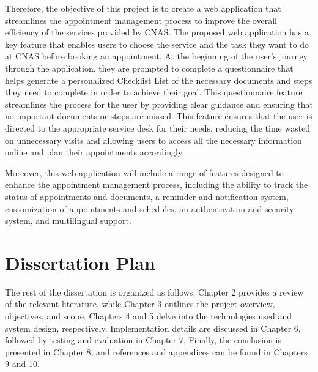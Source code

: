 Therefore, the objective of this project is to create a web application that streamlines the appointment management process to improve the overall efficiency of the services provided by CNAS. The proposed web application has a key feature that enables users to choose the service and the task they want to do at CNAS before booking an appointment. At the beginning of the user's journey through the application, they are prompted to complete a questionnaire that helps generate a personalized Checklist List of the necessary documents and steps they need to complete in order to achieve their goal. This questionnaire feature streamlines the process for the user by providing clear guidance and ensuring that no important documents or steps are missed. This feature ensures that the user is directed to the appropriate service desk for their needs, reducing the time wasted on unnecessary visits and allowing users to access all the necessary information online and plan their appointments accordingly.

Moreover, this web application will include a range of features designed to enhance the appointment management process, including the ability to track the status of appointments and documents, a reminder and notification system, customization of appointments and schedules, an authentication and security system, and multilingual support.


\section{Dissertation Plan}

The rest of the dissertation is organized as follows: Chapter 2 provides a review of the relevant literature, while Chapter 3 outlines the project overview, objectives, and scope. Chapters 4 and 5 delve into the technologies used and system design, respectively. Implementation details are discussed in Chapter 6, followed by testing and evaluation in Chapter 7. Finally, the conclusion is presented in Chapter 8, and references and appendices can be found in Chapters 9 and 10.

